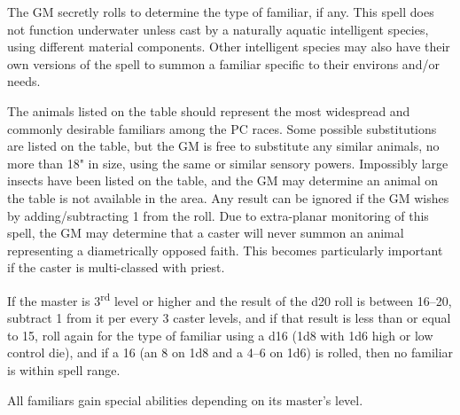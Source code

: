 \begin{multicols}{2}

The GM secretly rolls to determine the type of familiar, if any.  This spell does not function underwater unless cast by a naturally aquatic intelligent species, using different material components.  Other intelligent species may also have their own versions of the spell to summon a familiar specific to their environs and/or needs.  

The animals listed on the table should represent the most widespread and commonly desirable familiars among the PC races.  Some possible substitutions are listed on the table, but the GM is free to substitute any similar animals, no more than 18" in size, using the same or similar sensory powers.  Impossibly large insects have been listed on the table, and the GM may determine an animal on the table is not available in the area.  Any result can be ignored if the GM wishes by adding/subtracting 1 from the roll.  Due to extra-planar monitoring of this spell, the GM may determine that a caster will never summon an animal representing a diametrically opposed faith.  This becomes particularly important if the caster is multi-classed with priest.

If the master is 3\textsuperscript{rd} level or higher and the result of the d20 roll is between 16--20, subtract 1 from it per every 3 caster levels, and if that result is less than or equal to 15, roll again for the type of familiar using a d16 (1d8 with 1d6 high or low control die), and if a 16 (an 8 on 1d8 and a 4--6 on 1d6) is rolled, then no familiar is within spell range.

All familiars gain special abilities depending on its master's level.


\end{multicols}

